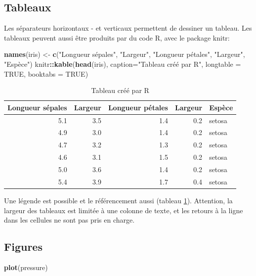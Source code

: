 \documentclass[fleqn,10pt]{ArtEcoFoG} %
\newenvironment{Shaded}{\begin{snugshade}}{\end{snugshade}}
\newcommand{\KeywordTok}[1]{\textcolor[rgb]{0.13,0.29,0.53}{\textbf{{#1}}}}
\newcommand{\DataTypeTok}[1]{\textcolor[rgb]{0.13,0.29,0.53}{{#1}}}
\newcommand{\StringTok}[1]{\textcolor[rgb]{0.31,0.60,0.02}{{#1}}}
\newcommand{\OtherTok}[1]{\textcolor[rgb]{0.56,0.35,0.01}{{#1}}}
\newcommand{\OperatorTok}[1]{\textcolor[rgb]{0.81,0.36,0.00}{\textbf{{#1}}}}
\newcommand{\NormalTok}[1]{{#1}}
\begin{document}
\subsection{Tableaux}\label{tableaux}

Les séparateurs horizontaux - et verticaux \textbar{} permettent de
dessiner un tableau. Les tableaux peuvent aussi être produits par du
code R, avec le package knitr:

\begin{Shaded}
\begin{Highlighting}[]
\KeywordTok{names}\NormalTok{(iris) <-}\StringTok{ }\KeywordTok{c}\NormalTok{(}\StringTok{"Longueur sépales"}\NormalTok{, }\StringTok{"Largeur"}\NormalTok{, }\StringTok{"Longueur pétales"}\NormalTok{, }\StringTok{"Largeur"}\NormalTok{, }\StringTok{"Espèce"}\NormalTok{)}
\NormalTok{knitr}\OperatorTok{::}\KeywordTok{kable}\NormalTok{(}\KeywordTok{head}\NormalTok{(iris), }\DataTypeTok{caption=}\StringTok{"Tableau créé par R"}\NormalTok{, }\DataTypeTok{longtable =} \OtherTok{TRUE}\NormalTok{, }\DataTypeTok{booktabs =} \OtherTok{TRUE}\NormalTok{)}
\end{Highlighting}
\end{Shaded}

\begin{longtable}[t]{rrrrl}
\caption{\label{tab:kable}Tableau créé par R}\\
\toprule
Longueur sépales & Largeur & Longueur pétales & Largeur & Espèce\\
\midrule
5.1 & 3.5 & 1.4 & 0.2 & setosa\\
4.9 & 3.0 & 1.4 & 0.2 & setosa\\
4.7 & 3.2 & 1.3 & 0.2 & setosa\\
4.6 & 3.1 & 1.5 & 0.2 & setosa\\
5.0 & 3.6 & 1.4 & 0.2 & setosa\\
5.4 & 3.9 & 1.7 & 0.4 & setosa\\
\bottomrule
\end{longtable}

Une légende est possible et le référencement aussi (tableau
\ref{tab:kable}). Attention, la largeur des tableaux est limitée à une
colonne de texte, et les retours à la ligne dans les cellules ne sont
pas pris en charge.

\subsection{Figures}\label{figures}

\begin{Shaded}
\begin{Highlighting}[]
\KeywordTok{plot}\NormalTok{(pressure)}
\end{Highlighting}
\end{Shaded}
\end{document}

